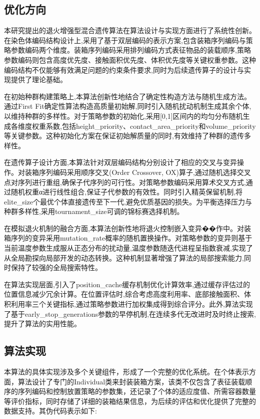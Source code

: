 \documentclass[UTF8]{ctexart}
\begin{document}
\subsection{优化方向}

本研究提出的退火增强型混合遗传算法在算法设计与实现方面进行了系统性创新。在染色体编码结构设计上,采用了基于双层编码的表示方案,包含装箱序列编码与策略参数编码两个维度。装箱序列编码采用排列编码方式表征物品的装载顺序,策略参数编码则包含高度优先度、接触面积优先度、体积优先度等关键权重参数。这种编码结构不仅能够有效满足问题的约束条件要求,同时为后续遗传算子的设计与实现提供了理论基础。

在初始种群构建策略上,本算法创新性地结合了确定性构造方法与随机生成方法。通过First Fit确定性算法构造高质量初始解,同时引入随机扰动机制生成其余个体,以维持种群的多样性。对于策略参数的初始化,采用[0,1]区间内的均匀分布随机生成各维度权重系数,包括height\_priority、contact\_area\_priority和volume\_priority等关键参数。这种初始化方案在保证初始解质量的同时,有效维持了种群的遗传多样性。

在遗传算子设计方面,本算法针对双层编码结构分别设计了相应的交叉与变异操作。对装箱序列编码采用顺序交叉(Order Crossover, OX)算子,通过随机选择交叉点对序列进行重组,确保子代序列的可行性。对策略参数编码采用算术交叉方式,通过随机权重α进行线性组合,保证子代参数的有效性。同时引入精英保留机制,将elite\_size个最优个体直接遗传至下一代,避免优质基因的损失。为平衡选择压力与种群多样性,采用tournament\_size可调的锦标赛选择机制。

在模拟退火机制的融合方面,本算法创新性地将退火控制嵌入变异��作中。对装箱序列的变异采用mutation\_rate概率的随机置换操作。对策略参数的变异则基于当前温度参数生成服从正态分布的扰动量,温度参数随迭代进程呈指数衰减,实现了从全局勘探向局部开发的动态转换。这种机制显著增强了算法的局部搜索能力,同时保持了较强的全局搜索特性。

在算法实现层面,引入了position\_cache缓存机制优化计算效率,通过缓存评估过的位置信息减少冗余计算。在位置评估时,综合考虑高度利用率、底部接触面积、体积利用率三个关键指标,通过策略参数进行加权集成得到综合评分。此外,算法实现了基于early\_stop\_generations参数的早停机制,在连续多代无改进时及时终止搜索,提升了算法的实用性能。

\subsection{算法实现}

本算法的具体实现涉及多个关键组件，形成了一个完整的优化系统。在个体表示方面，算法设计了专门的Individual类来封装装箱方案，该类不仅包含了表征装载顺序的序列编码和控制放置策略的参数集，还记录了个体的适应度值、所需容器数量等评价指标，同时存储了详细的装箱结果信息，为后续的评估和优化提供了完整的数据支持。其伪代码表示如下:
\end{document}
